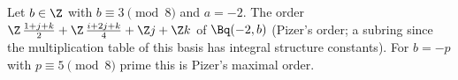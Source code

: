 Let $b\in\Z$ with $b\equiv3\pmod8$ and $a=-2$. The order $\Z\,\tfrac{1+j+k}2+\Z\,\tfrac{i+2j+k}4+\Z j+\Z k$ of $\Bq(-2,b)$ (Pizer's order; a subring since the
multiplication table of this basis has integral structure constants). For $b=-p$ with $p\equiv5\pmod8$ prime this is Pizer's maximal order.
